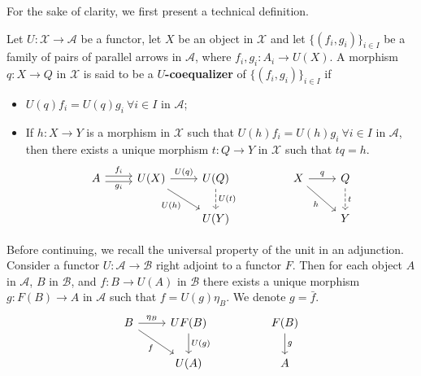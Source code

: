 For the sake of clarity, we first present a technical definition.

\begin{mainbox}{}
    \begin{defi}
        Let $U:\mathcal{X} \to \mathcal{A}$ be a functor, let $X$ be an object in $\mathcal{X}$ and let $\{(f_i,g_i)\}_{i\in I}$ be a family of pairs of parallel arrows in $\mathcal{A}$, where $f_i,g_i: A_i \to U(X)$. A morphism $q:X \to Q$ in $\mathcal{X}$ is said to be a $U$\textbf{-coequalizer} of $\{(f_i,g_i)\}_{i\in I}$ if 
        \begin{itemize}
            \item $U(q) f_i = U(q) g_i \ \forall i \in I$ in $\mathcal{A}$;
            \item If $h:X \to Y$ is a morphism in $\mathcal{X}$ such that $U(h) f_i = U(h) g_i \ \forall i \in I$ in $\mathcal{A}$, then there exists a unique morphism $t:Q \to Y$ in $\mathcal{X}$ such that $t q = h$.
        \[
\begin{tikzcd}
A \arrow[r, "f_i", shift left] \arrow[r, "g_i"', shift right] & U(X) \arrow[r, "U(q)"] \arrow[rd, "U(h)"'] & U(Q) \arrow[d, "U(t)", dashed] &  & X \arrow[r, "q"] \arrow[rd, "h"'] & Q \arrow[d, "t", dashed] \\
                                                              &                                            & U(Y)                           &  &                                   & Y                       
\end{tikzcd}
        \]
        \end{itemize}
    \end{defi}
\end{mainbox}

Before continuing, we recall the universal property of the unit in an adjunction. Consider a functor $U: \mathcal{A} \to \mathcal{B}$ right adjoint to a functor $F$. Then for each object $A$ in $\mathcal{A}$, $B$ in $\mathcal{B}$, and $f:B \to U(A)$ in $\mathcal{B}$ there exists a unique morphism $g: F(B) \to A$ in $\mathcal{A}$ such that $f=U(g)\eta_B$. We denote $g = \bar{f}$. 
\[
\begin{tikzcd}
B \arrow[r, "\eta_B"] \arrow[rd, "f"'] & UF(B) \arrow[d, "U(g)"] &  & F(B) \arrow[d, "g"] \\
                                       & U(A)                    &  & A                  
\end{tikzcd}
\]

